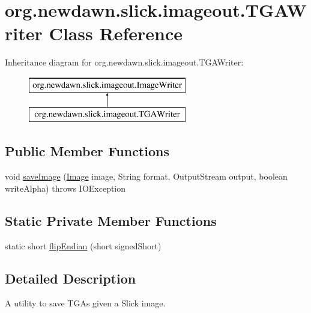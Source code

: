 \hypertarget{classorg_1_1newdawn_1_1slick_1_1imageout_1_1_t_g_a_writer}{}\section{org.\+newdawn.\+slick.\+imageout.\+T\+G\+A\+Writer Class Reference}
\label{classorg_1_1newdawn_1_1slick_1_1imageout_1_1_t_g_a_writer}
Inheritance diagram for org.\+newdawn.\+slick.\+imageout.\+T\+G\+A\+Writer\+:\begin{figure}[H]
\begin{center}
\leavevmode
\includegraphics[height=2.000000cm]{classorg_1_1newdawn_1_1slick_1_1imageout_1_1_t_g_a_writer}
\end{center}
\end{figure}
\subsection*{Public Member Functions}
\begin{DoxyCompactItemize}
\item 
void \mbox{\hyperlink{classorg_1_1newdawn_1_1slick_1_1imageout_1_1_t_g_a_writer_afd93706487ac566196147f002ba249b5}{save\+Image}} (\mbox{\hyperlink{classorg_1_1newdawn_1_1slick_1_1_image}{Image}} image, String format, Output\+Stream output, boolean write\+Alpha)  throws I\+O\+Exception 
\end{DoxyCompactItemize}
\subsection*{Static Private Member Functions}
\begin{DoxyCompactItemize}
\item 
static short \mbox{\hyperlink{classorg_1_1newdawn_1_1slick_1_1imageout_1_1_t_g_a_writer_a4e948a3f07436f54031b6f230a634a28}{flip\+Endian}} (short signed\+Short)
\end{DoxyCompactItemize}


\subsection{Detailed Description}
A utility to save T\+GA\textquotesingle{}s given a Slick image.

